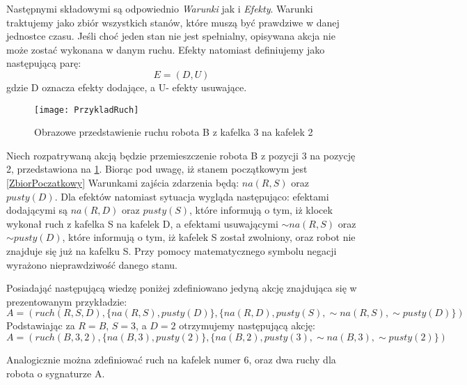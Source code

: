     Następnymi składowymi są odpowiednio \textit{Warunki} jak i \textit{Efekty}. Warunki traktujemy jako zbiór wszystkich stanów, które muszą być 
    prawdziwe w danej jednostce czasu. Jeśli choć jeden stan nie jest spełnialny, opisywana akcja nie może zostać wykonana w danym ruchu.
    Efekty natomiast definiujemy jako następującą parę:
    \begin{equation}
        E=(D,U)
    \end{equation}
    gdzie D oznacza efekty dodające, a U- efekty usuwające.
    \begin{figure}[H]
        \texttt{[image: PrzykladRuch]}
        \centering
        \caption{Obrazowe przedstawienie ruchu robota B z kafelka 3 na kafelek 2}
        \label{PrzykladRuch}
    \end{figure}
    Niech rozpatrywaną akcją będzie przemieszczenie robota B z pozycji 3 na pozycję 2,
    przedstawiona na \ref{PrzykladRuch}. Biorąc pod uwagę, iż stanem początkowym jest \ref{ZbiorPoczatkowy} Warunkami zajścia zdarzenia
    będą: $na(R,S)$ oraz $pusty(D)$. Dla efektów natomiast sytuacja wygląda następująco: efektami dodającymi są $na(R,D)$ oraz $pusty(S)$, które informują o tym, iż klocek 
    wykonał ruch z kafelka S na kafelek D, a efektami usuwającymi $\sim na(R,S)$ oraz $\sim pusty(D)$, które informują o tym, iż kafelek S został zwolniony, 
    oraz robot nie znajduje się już na kafelku S. Przy pomocy matematycznego symbolu negacji wyrażono nieprawdziwość danego stanu.

        Posiadająć następującą wiedzę poniżej zdefiniowano jedyną akcję znajdująca się w prezentowanym przykładzie:
    \begin{equation}
        \label{Ruch}
        A=(ruch(R,S,D),\{na(R,S),pusty(D)\},\{na(R,D),pusty(S),\sim na(R,S),\sim pusty(D)\})
    \end{equation}
    Podstawiając za $R=B$, $S=3$, a $D=2$ otrzymujemy następującą akcję:
    \begin{equation}
        A=(ruch(B,3,2),\{na(B,3),pusty(2)\},\{na(B,2),pusty(3),\sim na(B,3),\sim pusty(2)\})
    \end{equation}
    
    Analogicznie można zdefiniować ruch na kafelek numer 6, oraz dwa ruchy dla robota o sygnaturze A.


